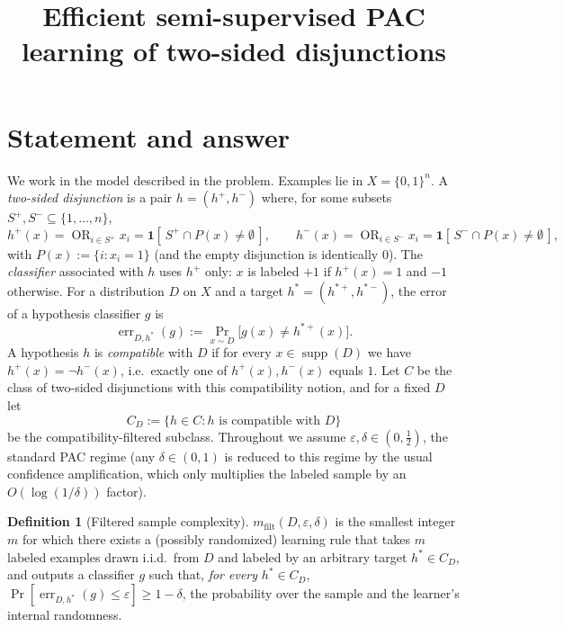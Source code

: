 \documentclass{amsart}
\theoremstyle{definition}
\newtheorem{definition}{Definition}
\DeclareMathOperator{\supp}{supp}
\DeclareMathOperator{\err}{err}
\DeclareMathOperator*{\OR}{OR}
\newcommand{\eps}{\varepsilon}
\newcommand{\X}{\{0,1\}^n}
\begin{document}
\title{Efficient semi-supervised PAC learning of two-sided disjunctions}
\maketitle

\section{Statement and answer}

We work in the model described in the problem. Examples lie in $X=\X$. A
\emph{two-sided disjunction} is a pair $h=(h^+,h^-)$ where, for some subsets
$S^+,S^-\subseteq\{1,\dots,n\}$,
\[
  h^+(x)=\OR_{i\in S^+} x_i=\mathbf 1[\,S^+\cap P(x)\neq\emptyset\,],\qquad
  h^-(x)=\OR_{i\in S^-} x_i=\mathbf 1[\,S^-\cap P(x)\neq\emptyset\,],
\]
with $P(x):=\{i:x_i=1\}$ (and the empty disjunction is identically $0$). The
\emph{classifier} associated with $h$ uses $h^+$ only: $x$ is labeled $+1$ if
$h^+(x)=1$ and $-1$ otherwise. For a distribution $D$ on $X$ and a target
$h^\ast=(h^{\ast+},h^{\ast-})$, the error of a hypothesis classifier $g$ is
\[
  \err_{D,h^\ast}(g):=\Pr_{x\sim D}\bigl[g(x)\neq h^{\ast+}(x)\bigr].
\]
A hypothesis $h$ is \emph{compatible} with $D$ if for every $x\in\supp(D)$ we
have $h^+(x)=\lnot h^-(x)$, i.e.\ exactly one of $h^+(x),h^-(x)$ equals $1$. Let
$C$ be the class of two-sided disjunctions with this compatibility notion, and
for a fixed $D$ let
\[
  C_D:=\{h\in C: h \text{ is compatible with } D\}
\]
be the compatibility-filtered subclass. Throughout we assume
$\eps,\delta\in(0,\tfrac12)$, the standard PAC regime (any
$\delta\in(0,1)$ is reduced to this regime by the usual confidence
amplification, which only multiplies the labeled sample by an
$O(\log(1/\delta))$ factor).

\begin{definition}[Filtered sample complexity]\label{def:filt}
$m_{\mathrm{filt}}(D,\eps,\delta)$ is the smallest integer $m$ for which there
exists a (possibly randomized) learning rule that takes $m$ labeled examples
drawn i.i.d.\ from $D$ and labeled by an arbitrary target $h^\ast\in C_D$, and
outputs a classifier $g$ such that, \emph{for every} $h^\ast\in C_D$,
$\Pr[\err_{D,h^\ast}(g)\le\eps]\ge1-\delta$, the probability over the sample and
the learner's internal randomness.
\end{definition}
\end{document}

